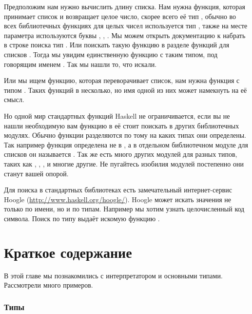Предположим нам нужно вычислить длину списка. Нам нужна функция, которая
принимает список и возвращает целое число, скорее всего её тип
, обычно во всех библиотечных функциях для целых чисел
используется тип , также на месте параметра используются буквы
, , . Мы можем открыть документацию к 
набрать в строке поиска тип . Или поискать такую функцию
в разделе функций для списков . Тогда мы увидим
единственную функцию с таким типом, под говорящим именем .
Так мы нашли то, что искали.

Или мы ищем функцию, которая переворачивает список, нам нужна функция с
типом \In{[a] -> [a]}. Таких функций в  несколько, но имя
 одной из них может намекнуть на её смысл.

Но одной  мир стандартных функций Haskell не ограничивается,
если вы не нашли необходимую вам функцию в  её стоит
поискать в других библиотечных модулях. Обычно функции разделяются по
тому на каких типах они определены. Так например функция
 определена не в , а в
отдельном библиотечном модуле для списков он называется .
Так же есть много других модулей для разных типов, таких как
, , ,  и
многие другие. Не пугайтесь изобилия модулей постепенно они станут вашей
опорой.

Для поиска в стандартных библиотеках есть замечательный интернет-сервис
Hoogle (\url{http://www.haskell.org/hoogle/}). Hoogle может искать
значения не только по имени, но и по типам. Например мы хотим узнать
целочисленный код символа. Поиск по типу  выдаёт искомую
функцию .

\section{Краткое содержание}

В этой главе мы познакомились с интерпретатором  и основными
типами. Рассмотрели много примеров.

\subsubsection{Типы}

